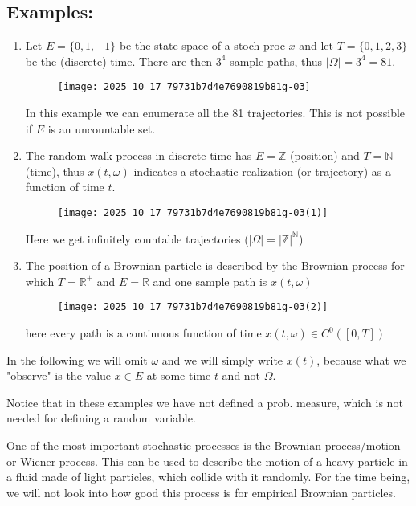 \subsection*{Examples:}
\begin{enumerate}
    \item Let $E=\{0,1,-1\}$ be the state space of a stoch-proc $x$ and let $T=\{0,1,2,3\}$ be the (discrete) time. There are then $3^{4}$ sample paths, thus $|
\Omega|=3^{4}=81$.
    \begin{figure}[H]
        \centering
        \texttt{[image: 2025\_10\_17\_79731b7d4e7690819b81g-03]}
    \end{figure}
    In this example we can enumerate all the 81 trajectories. This is not possible if $E$ is an uncountable set.
    \item The random walk process in discrete time has $E=\mathbb{Z}$ (position) and $T=\mathbb{N}$ (time), thus $x(t, \omega)$ indicates a stochastic realization (or trajectory) as a function of time $t$.
    \begin{figure}[H]
        \centering
        \texttt{[image: 2025\_10\_17\_79731b7d4e7690819b81g-03(1)]}
    \end{figure}
    Here we get infinitely countable trajectories ($|
\Omega|=|\mathbb{Z}|^{\mathbb{N}}$)
    \item The position of a Brownian particle is described by the Brownian process for which $T=\mathbb{R}^{+}$ and $E=\mathbb{R}$ and one sample path is $x(t, \omega)$
    \begin{figure}[H]
        \centering
        \texttt{[image: 2025\_10\_17\_79731b7d4e7690819b81g-03(2)]}
    \end{figure}
    here every path is a continuous function of time $x(t, \omega) \in C^{0}([0, T])$
\end{enumerate}
In the following we will omit $\omega$ and we will simply write $x(t)$, because what we "observe" is the value $x \in E$ at some time $t$ and not $
\Omega$.

Notice that in these examples we have not defined a prob. measure, which is not needed for defining a random variable.

One of the most important stochastic processes is the Brownian process/motion or Wiener process.
This can be used to describe the motion of a heavy particle in a fluid made of light particles, which collide with it randomly. For the time being, we will not look into how good this process is for empirical Brownian particles.

